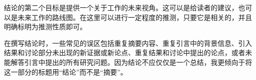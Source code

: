结论的第二个目标是提供一个关于工作的未来视角。这可以是给读者的建议，也可以是未来工作的路线图。在这里可以进行一定程度的推测，只要它是相关的，并且明确标明为推测性质即可。

在撰写结论时，一些常见的误区包括重复摘要内容、重复引言中的背景信息、引入结果和讨论部分未出现的新证据或新论点、重复结果和讨论中提出的论点，或者未能解答引言中提出的所有研究问题。因为结论不应仅仅是一个总结，我更倾向于将这一部分的标题用“结论”而不是“摘要”。

